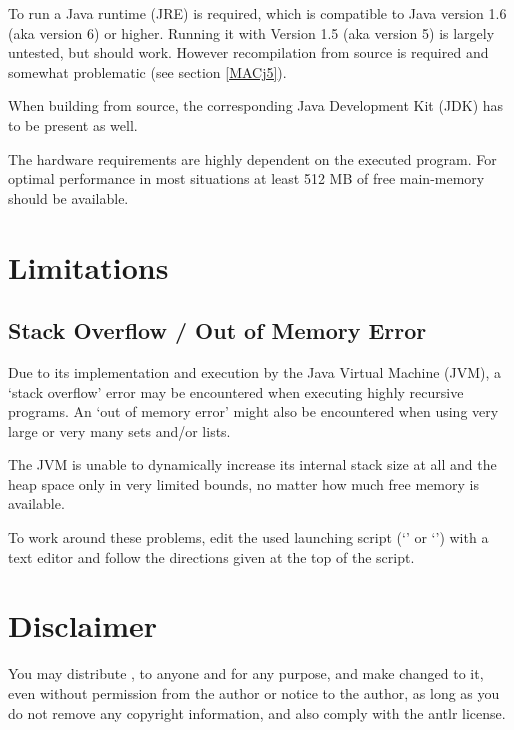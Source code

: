 To run \setlX{} a Java runtime (JRE) is required, which is compatible to Java version 1.6 (aka version 6) or higher. Running it with Version 1.5 (aka version 5) is largely untested, but should work. However recompilation from source is required and somewhat problematic (see section \ref{MACj5}).

When building from source, the corresponding Java Development Kit (JDK) has to be present as well.

The hardware requirements are highly dependent on the executed \SetlX{} program. For optimal performance in most situations at least 512 MB of free main-memory should be available.

\section{Limitations}

\subsection{Stack Overflow \slash{} Out of Memory Error}

Due to its implementation and execution by the Java Virtual Machine (JVM), a `stack overflow' error may be encountered when executing highly recursive \SetlX{} programs. An `out of memory error' might also be encountered when using very large or very many sets and\slash{}or lists.

The JVM is unable to dynamically increase its internal stack size at all and the heap space only in very limited bounds, no matter how much free memory is available.

To work around these problems, edit the used launching script (`' or `') with a text editor and follow the directions given at the top of the script.

%


\section{Disclaimer}
You may distribute \setlX{}, to anyone and for any purpose, and make changed to it, even without permission from the author or notice to the author, as long as you do not remove any copyright information, and also comply with the antlr license.

